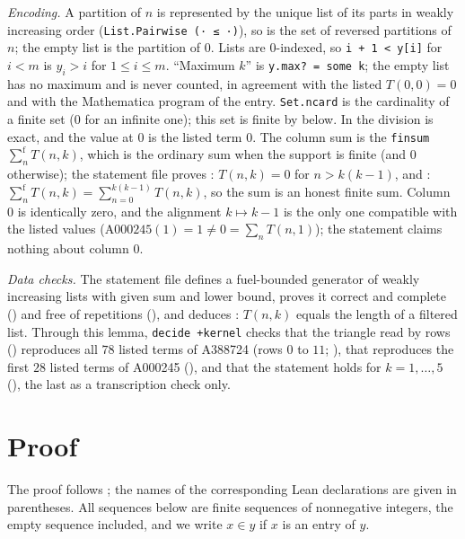\documentclass[11pt]{amsart}
\theoremstyle{plain}
\theoremstyle{definition}
\begin{document}
\emph{Encoding.} A partition of $n$ is represented by the unique list of its parts in weakly increasing order (\texttt{List.Pairwise (· ≤ ·)}), so  is the set of reversed partitions of $n$; the empty list is the partition of $0$. Lists are $0$-indexed, so \texttt{i + 1 < y[i]} for $i<m$ is $y_i>i$ for $1\le i\le m$. ``Maximum $k$'' is \texttt{y.max?\ = some k}; the empty list has no maximum and is never counted, in agreement with the listed $T(0,0)=0$ and with the Mathematica program of the entry. \texttt{Set.ncard} is the cardinality of a finite set ($0$ for an infinite one); this set is finite by  below. In  the division is exact, and the value at $0$ is the listed term $0$. The column sum is the \texttt{finsum} $\sum^{\mathrm f}_n T(n,k)$, which is the ordinary sum when the support is finite (and $0$ otherwise); the statement file proves : $T(n,k)=0$ for $n>k(k-1)$, and : $\sum^{\mathrm f}_nT(n,k)=\sum_{n=0}^{k(k-1)}T(n,k)$, so the sum is an honest finite sum. Column $0$ is identically zero, and the alignment $k\mapsto k-1$ is the only one compatible with the listed values ($\mathrm{A000245}(1)=1\neq0=\sum_nT(n,1)$); the statement claims nothing about column $0$.

\emph{Data checks.} The statement file defines a fuel-bounded generator  of weakly increasing lists with given sum and lower bound, proves it correct and complete () and free of repetitions (), and deduces : $T(n,k)$ equals the length  of a filtered list. Through this lemma, \texttt{decide +kernel} checks that the triangle read by rows () reproduces all $78$ listed terms of A388724 (rows $0$ to $11$; ), that  reproduces the first $28$ listed terms of A000245 (), and that the statement holds for $k=1,\dots,5$ (), the last as a transcription check only.

\section{Proof}\label{sec:proof}

The proof follows ; the names of the corresponding Lean declarations are given in parentheses. All sequences below are finite sequences of nonnegative integers, the empty sequence included, and we write $x\in y$ if $x$ is an entry of $y$.
\end{document}
